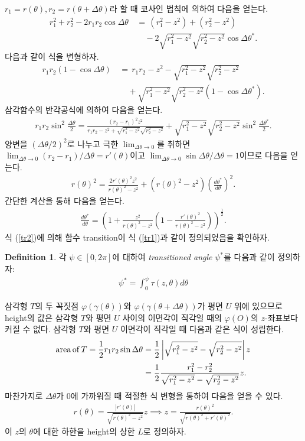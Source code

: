 \documentclass{amsart}
\theoremstyle{plain}
\theoremstyle{definition}
\newtheorem*{definition}{Definition}
\theoremstyle{remark}
\begin{document}
$r_1=r(\theta), r_2=r(\theta+\Delta\theta)$라 할 때 코사인 법칙에 의하여 다음을 얻는다.
\begin{align*}
r_1^2+r_2^2-2r_1r_2\cos\Delta\theta\,&=\,\left(r_1^2-z^2\right)+\left(r_2^2-z^2\right)
\\&\quad-2\sqrt{r_1^2-z^2}\sqrt{r_2^2-z^2}\cos\Delta\theta^*.
\end{align*}
다음과 같이 식을 변형하자.
\begin{align*}
r_1r_2(1-\cos\Delta\theta)\,&=\,r_1r_2-z^2-\sqrt{r_1^2-z^2}\sqrt{r_2^2-z^2}
\\&\quad+\sqrt{r_1^2-z^2}\sqrt{r_2^2-z^2}(1-\cos\Delta\theta^*).
\end{align*}
삼각함수의 반각공식에 의하여 다음을 얻는다.
\begin{align*}
r_1r_2\sin^2\frac{\Delta\theta}2=\frac{(r_2-r_1)^2z^2}{r_1r_2-z^2+\sqrt{r_1^2-z^2}\sqrt{r_2^2-z^2}}+\sqrt{r_1^2-z^2}\sqrt{r_2^2-z^2}\sin^2\frac{\Delta\theta^*}2.
\end{align*}
양변을 $(\Delta\theta/2)^2$로 나누고 극한 $\lim_{\Delta\theta\to0}$를 취하면 $\lim_{\Delta\theta\to0}(r_2-r_1)/\Delta\theta=r'(\theta)$이고 $\lim_{\Delta\theta\to0}\sin\Delta\theta/\Delta\theta=1$이므로 다음을 얻는다.
\begin{align*}
r(\theta)^2=\frac{2r'(\theta)^2z^2}{r(\theta)^2-z^2}+\left(r(\theta)^2-z^2\right)\left(\frac{d\theta^*}{d\theta}\right)^2.
\end{align*}
간단한 계산을 통해 다음을 얻는다.
\begin{align}\label{tr2}
\frac{d\theta^*}{d\theta}=\left(1+\frac{z^2}{r(\theta)^2 -z^2}\left(1-\frac{r'(\theta)^2}{r(\theta)^2 -z^2}\right)\right)^{\frac12}.
\end{align}
식 (\ref{tr2})에 의해 함수 transition이 식 (\ref{tr1})과 같이 정의되었음을 확인하자.

\begin{definition}
각 $\psi\in[0,2\pi]$에 대하여 {\it transitioned angle} $\psi^*$를 다음과 같이 정의하자:
\begin{align*}
\psi^*=\int_0^{\psi}\tau(z,\theta)d\theta
\end{align*}
\end{definition}

삼각형 $T$의 두 꼭짓점 $\varphi(\gamma(\theta))$와 $\varphi(\gamma(\theta+\Delta\theta))$가 평면 $U$ 위에 있으므로 height의 값은 삼각형 $T$와 평면 $U$ 사이의 이면각이 직각일 때의 $\varphi(O)$의 $z$-좌표보다 커질 수 없다.
삼각형 $T$와 평면 $U$ 이면각이 직각일 때 다음과 같은 식이 성립한다.
\begin{align*}
{\rm area}\,{\rm of}\,T=\frac12r_1r_2\sin\Delta\theta&=\frac12\left|\sqrt{r_1^2-z^2}-\sqrt{r_2^2-z^2}\right|z
\\&=\frac12\frac{r_1^2-r_2^2}{\sqrt{r_1^2-z^2}-\sqrt{r_2^2-z^2}}z.
\end{align*}
마찬가지로 $\Delta\theta$가 $0$에 가까워질 때 적절한 식 변형을 통하여 다음을 얻을 수 있다.
\begin{align}\label{r'}
r(\theta)=\frac{\left|r'(\theta)\right|}{\sqrt{r(\theta)^2-z^2}}z \implies
z=\frac{r(\theta)^2}{\sqrt{r(\theta)^2+r'(\theta)^2}}.
\end{align}
이 $z$의 $\theta$에 대한 하한을 height의 상한 $L$로 정의하자.
\end{document}
